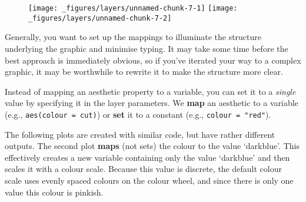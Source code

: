 \begin{Shaded}
\begin{Highlighting}[]
 \StringTok{ }
\StringTok{  }\NormalTok{() +}\StringTok{ }
\StringTok{  }\NormalTok{(} \NormalTok{, } \NormalTok{) +}
\StringTok{  }\NormalTok{(} \NormalTok{)}

\StringTok{ }
\StringTok{  }\NormalTok{(}\NormalTok{(} \StringTok{ }
\StringTok{  }\NormalTok{(} \NormalTok{, } \NormalTok{) +}\StringTok{ }
\StringTok{  }\NormalTok{(} \NormalTok{)}
\end{Highlighting}
\end{Shaded}

\begin{figure}[H]
  \texttt{[image: \_figures/layers/unnamed-chunk-7-1]}%
  \texttt{[image: \_figures/layers/unnamed-chunk-7-2]}
\end{figure}

Generally, you want to set up the mappings to illuminate the structure
underlying the graphic and minimise typing. It may take some time before
the best approach is immediately obvious, so if you've iterated your way
to a complex graphic, it may be worthwhile to rewrite it to make the
structure more clear.


Instead of mapping an aesthetic property to a variable, you can set it
to a \emph{single} value by specifying it in the layer parameters. We
\textbf{map} an aesthetic to a variable (e.g.,
\texttt{aes(colour\ =\ cut)}) or \textbf{set} it to a constant (e.g.,
\texttt{colour\ =\ "red"}). 

The following plots are created with similar code, but have rather
different outputs. The second plot \textbf{maps} (not sets) the colour
to the value `darkblue'. This effectively creates a new variable
containing only the value `darkblue' and then scales it with a colour
scale. Because this value is discrete, the default colour scale uses
evenly spaced colours on the colour wheel, and since there is only one
value this colour is pinkish.


